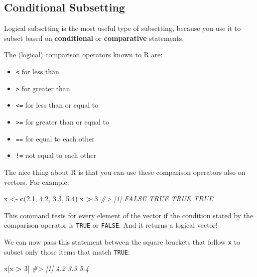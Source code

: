 \documentclass[]{book}
\newenvironment{Shaded}{\begin{snugshade}}{\end{snugshade}}
\newcommand{\KeywordTok}[1]{\textcolor[rgb]{0.13,0.29,0.53}{\textbf{#1}}}
\newcommand{\DecValTok}[1]{\textcolor[rgb]{0.00,0.00,0.81}{#1}}
\newcommand{\FloatTok}[1]{\textcolor[rgb]{0.00,0.00,0.81}{#1}}
\newcommand{\StringTok}[1]{\textcolor[rgb]{0.31,0.60,0.02}{#1}}
\newcommand{\CommentTok}[1]{\textcolor[rgb]{0.56,0.35,0.01}{\textit{#1}}}
\newcommand{\OperatorTok}[1]{\textcolor[rgb]{0.81,0.36,0.00}{\textbf{#1}}}
\newcommand{\NormalTok}[1]{#1}
\providecommand{\tightlist}{%
  \setlength{\itemsep}{0pt}\setlength{\parskip}{0pt}}
\begin{document}
\subsection{Conditional Subsetting}\label{conditional-subsetting}

Logical subsetting is the most useful type of subsetting, because you
use it to subset based on \textbf{conditional} or \textbf{comparative}
statements.

The (logical) comparison operators known to R are:

\begin{itemize}
\tightlist
\item
  \texttt{\textless{}} for less than
\item
  \texttt{\textgreater{}} for greater than
\item
  \texttt{\textless{}=} for less than or equal to
\item
  \texttt{\textgreater{}=} for greater than or equal to
\item
  \texttt{==} for equal to each other
\item
  \texttt{!=} not equal to each other
\end{itemize}

The nice thing about R is that you can use these comparison operators
also on vectors. For example:

\begin{Shaded}
\begin{Highlighting}[]
\NormalTok{x <-}\StringTok{ }\KeywordTok{c}\NormalTok{(}\FloatTok{2.1}\NormalTok{, }\FloatTok{4.2}\NormalTok{, }\FloatTok{3.3}\NormalTok{, }\FloatTok{5.4}\NormalTok{)}
\NormalTok{x }\OperatorTok{>}\StringTok{ }\DecValTok{3}
\CommentTok{#> [1] FALSE  TRUE  TRUE  TRUE}
\end{Highlighting}
\end{Shaded}

This command tests for every element of the vector if the condition
stated by the comparison operator is \texttt{TRUE} or \texttt{FALSE}.
And it returns a logical vector!

We can now pass this statement between the square brackets that follow
\texttt{x} to subset only those items that match \texttt{TRUE}:

\begin{Shaded}
\begin{Highlighting}[]
\NormalTok{x[x }\OperatorTok{>}\StringTok{ }\DecValTok{3}\NormalTok{]}
\CommentTok{#> [1] 4.2 3.3 5.4}
\end{Highlighting}
\end{Shaded}
\end{document}
